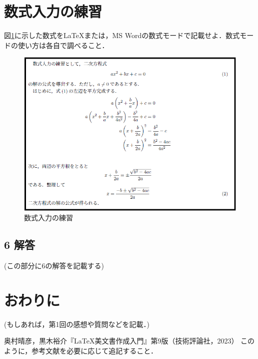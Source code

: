 \documentclass[11pt, a4paper]{jsarticle}
\begin{document}
\newpage
\section{数式入力の練習}
図\ref{fig:eqs}に示した数式を\LaTeX または，MS Wordの数式モードで記載せよ．数式モードの使い方は各自で調べること．

\begin{figure}[h]
\centering
\includegraphics[width=0.9\linewidth]{eqs.png}
\caption{数式入力の練習}
\label{fig:eqs}
\end{figure}

\subsection*{6 解答}
(この部分に6の解答を記載する)

\section*{おわりに}

(もしあれば，第1回の感想や質問などを記載．)

 
\begin{thebibliography}{99}
     奥村晴彦，黒木裕介『\LaTeX 美文書作成入門』第9版（技術評論社，2023）
     このように，参考文献を必要に応じて追記すること．
\end{thebibliography}
\end{document}
